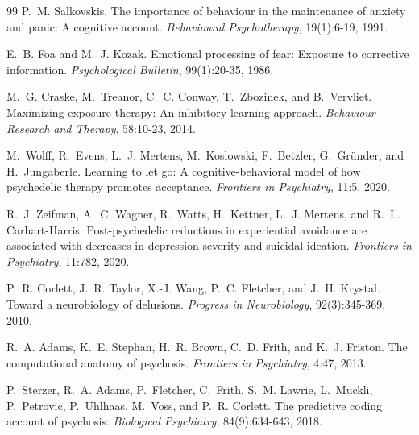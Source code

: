 \documentclass[11pt]{article}
\begin{document}
\begin{thebibliography}{99}
 P.~M. Salkovskis. The importance of behaviour in the
maintenance of anxiety and panic: A cognitive account. \emph{Behavioural
Psychotherapy}, 19(1):6-19, 1991.

 E.~B. Foa and M.~J. Kozak. Emotional processing of fear:
Exposure to corrective information. \emph{Psychological Bulletin}, 99(1):20-35,
1986.

 M.~G. Craske, M.~Treanor, C.~C. Conway, T.~Zbozinek, and
B.~Vervliet. Maximizing exposure therapy: An inhibitory learning approach.
\emph{Behaviour Research and Therapy}, 58:10-23, 2014.

 M.~Wolff, R.~Evens, L.~J. Mertens, M.~Koslowski, F.~Betzler,
G.~Gr\"under, and H.~Jungaberle. Learning to let go: A cognitive-behavioral model
of how psychedelic therapy promotes acceptance. \emph{Frontiers in Psychiatry},
11:5, 2020.

 R.~J. Zeifman, A.~C. Wagner, R.~Watts, H.~Kettner,
L.~J. Mertens, and R.~L. Carhart-Harris. Post-psychedelic reductions in
experiential avoidance are associated with decreases in depression severity and
suicidal ideation. \emph{Frontiers in Psychiatry}, 11:782, 2020.

 P.~R. Corlett, J.~R. Taylor, X.-J. Wang, P.~C. Fletcher,
and J.~H. Krystal. Toward a neurobiology of delusions. \emph{Progress in
Neurobiology}, 92(3):345-369, 2010.

 R.~A. Adams, K.~E. Stephan, H.~R. Brown, C.~D. Frith, and
K.~J. Friston. The computational anatomy of psychosis. \emph{Frontiers in
Psychiatry}, 4:47, 2013.

 P.~Sterzer, R.~A. Adams, P.~Fletcher, C.~Frith, S.~M.
Lawrie, L.~Muckli, P.~Petrovic, P.~Uhlhaas, M.~Voss, and P.~R. Corlett. The
predictive coding account of psychosis. \emph{Biological Psychiatry},
84(9):634-643, 2018.

\end{thebibliography}
\end{document}
